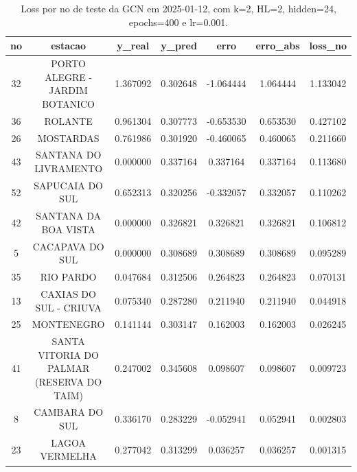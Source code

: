 \begin{table}[h]
\centering
\caption{Loss por no de teste da GCN em 2025-01-12, com k=2, HL=2, hidden=24, epochs=400 e lr=0.001.}
\label{tab:gcn_loss_k2_hl2_h24_e400_d20250112}
\begin{tabular}{ccccccc}
\toprule
no & estacao & y\_real & y\_pred & erro & erro\_abs & loss\_no \\
\midrule
32 & PORTO ALEGRE - JARDIM BOTANICO & 1.367092 & 0.302648 & -1.064444 & 1.064444 & 1.133042 \\
36 & ROLANTE & 0.961304 & 0.307773 & -0.653530 & 0.653530 & 0.427102 \\
26 & MOSTARDAS & 0.761986 & 0.301920 & -0.460065 & 0.460065 & 0.211660 \\
43 & SANTANA DO LIVRAMENTO & 0.000000 & 0.337164 & 0.337164 & 0.337164 & 0.113680 \\
52 & SAPUCAIA DO SUL & 0.652313 & 0.320256 & -0.332057 & 0.332057 & 0.110262 \\
42 & SANTANA DA BOA VISTA & 0.000000 & 0.326821 & 0.326821 & 0.326821 & 0.106812 \\
5 & CACAPAVA DO SUL & 0.000000 & 0.308689 & 0.308689 & 0.308689 & 0.095289 \\
35 & RIO PARDO & 0.047684 & 0.312506 & 0.264823 & 0.264823 & 0.070131 \\
13 & CAXIAS DO SUL - CRIUVA & 0.075340 & 0.287280 & 0.211940 & 0.211940 & 0.044918 \\
25 & MONTENEGRO & 0.141144 & 0.303147 & 0.162003 & 0.162003 & 0.026245 \\
41 & SANTA VITORIA DO PALMAR (RESERVA DO TAIM) & 0.247002 & 0.345608 & 0.098607 & 0.098607 & 0.009723 \\
8 & CAMBARA DO SUL & 0.336170 & 0.283229 & -0.052941 & 0.052941 & 0.002803 \\
23 & LAGOA VERMELHA & 0.277042 & 0.313299 & 0.036257 & 0.036257 & 0.001315 \\
\bottomrule
\end{tabular}
\end{table}
